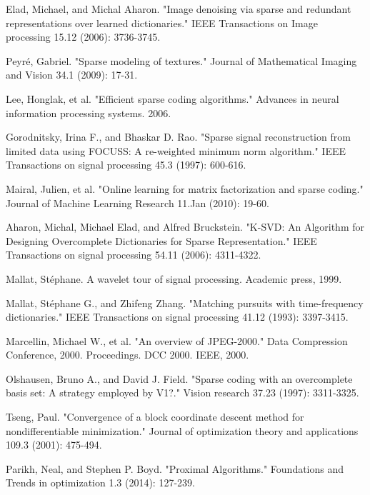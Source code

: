 \documentclass[a4paper,11pt]{article}
\begin{document}
\begin{thebibliography}{9}

Elad, Michael, and Michal Aharon. "Image denoising via sparse and redundant representations over learned dictionaries." IEEE Transactions on Image processing 15.12 (2006): 3736-3745.

Peyré, Gabriel. "Sparse modeling of textures." Journal of Mathematical Imaging and Vision 34.1 (2009): 17-31.

Lee, Honglak, et al. "Efficient sparse coding algorithms." Advances in neural information processing systems. 2006.

Gorodnitsky, Irina F., and Bhaskar D. Rao. "Sparse signal reconstruction from limited data using FOCUSS: A re-weighted minimum norm algorithm." IEEE Transactions on signal processing 45.3 (1997): 600-616.

Mairal, Julien, et al. "Online learning for matrix factorization and sparse coding." Journal of Machine Learning Research 11.Jan (2010): 19-60.

Aharon, Michal, Michael Elad, and Alfred Bruckstein. "K-SVD: An Algorithm for Designing Overcomplete Dictionaries for Sparse Representation." IEEE Transactions on signal processing 54.11 (2006): 4311-4322.

Mallat, Stéphane. A wavelet tour of signal processing. Academic press, 1999.

Mallat, Stéphane G., and Zhifeng Zhang. "Matching pursuits with time-frequency dictionaries." IEEE Transactions on signal processing 41.12 (1993): 3397-3415.

Marcellin, Michael W., et al. "An overview of JPEG-2000." Data Compression Conference, 2000. Proceedings. DCC 2000. IEEE, 2000.

Olshausen, Bruno A., and David J. Field. "Sparse coding with an overcomplete basis set: A strategy employed by V1?." Vision research 37.23 (1997): 3311-3325.

Tseng, Paul. "Convergence of a block coordinate descent method for nondifferentiable minimization." Journal of optimization theory and applications 109.3 (2001): 475-494.

Parikh, Neal, and Stephen P. Boyd. "Proximal Algorithms." Foundations and Trends in optimization 1.3 (2014): 127-239.


\end{thebibliography}
\end{document}
